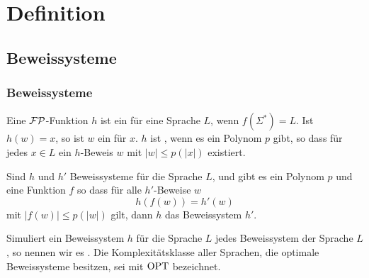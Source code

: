 \section{Definition} 
\subsection{Beweissysteme}

\begin{frame}
  \frametitle{Beweissysteme}
  
   Eine \(\mathcal{FP}\)-Funktion \(h\) ist ein  für eine Sprache \(L\), wenn \(f(\Sigma^*) = L\). 
   Ist \(h(w) = x\), so ist \(w\) ein  für \(x\). 
   \(h\) ist , wenn es ein Polynom \(p\) gibt, so dass für jedes \(x \in L\) ein \(h\)-Beweis \(w\) mit \(|w| \leq p(|x|)\) existiert. 
  
   Sind \(h\) und \(h'\) Beweissysteme für die Sprache \(L\), 
   und gibt es ein Polynom \(p\) und eine Funktion \(f\) 
   so dass für alle \(h'\)-Beweise \(w\) \[ h(f(w)) = h'(w) \] 
   mit \(|f(w)| \leq p(|w|)\) gilt, 
   dann  \(h\) das Beweissystem \(h'\). 
  
   Simuliert ein Beweissystem \(h\) für die Sprache \(L\) jedes Beweissystem der Sprache \(L\), so nennen wir es . 
   Die Komplexitätsklasse aller Sprachen, die optimale Beweissysteme besitzen, sei mit \(\text{OPT}\) bezeichnet.
\end{frame}

